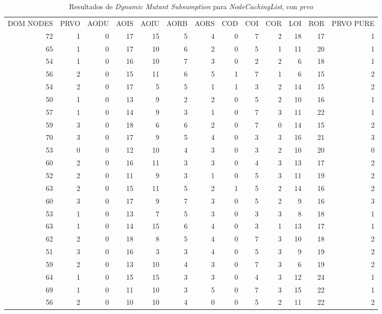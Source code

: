 \begin{table}[]
	\caption{Resultados de \emph{Dynamic Mutant Subsumption} para \emph{NodeCachingList}, con \emph{prvo}}
	\label{tables.results.subsumption.ncll.prvo}
	\centering
	\scriptsize
	\def\arraystretch{0.95}
	\setlength\tabcolsep{0.5mm}
	\begin{tabular}{rrrrrrrrrrrrr}
		DOM NODES & PRVO & AODU & AOIS & AOIU & AORB & AORS & COD & COI & COR & LOI & ROR & PRVO PURE \\
		72 & 1 & 0 & 17 & 15 & 5 & 4 & 0 & 7 & 2 & 18 & 17 & 1 \\
		65 & 1 & 0 & 17 & 10 & 6 & 2 & 0 & 5 & 1 & 11 & 20 & 1 \\
		54 & 1 & 0 & 16 & 10 & 7 & 3 & 0 & 2 & 2 & 6 & 18 & 1 \\
		56 & 2 & 0 & 15 & 11 & 6 & 5 & 1 & 7 & 1 & 6 & 15 & 2 \\
		54 & 2 & 0 & 17 & 5 & 5 & 1 & 1 & 3 & 2 & 14 & 15 & 2 \\
		50 & 1 & 0 & 13 & 9 & 2 & 2 & 0 & 5 & 2 & 10 & 16 & 1 \\
		57 & 1 & 0 & 14 & 9 & 3 & 1 & 0 & 7 & 3 & 11 & 22 & 1 \\
		59 & 3 & 0 & 18 & 6 & 6 & 2 & 0 & 7 & 0 & 14 & 15 & 2 \\
		70 & 3 & 0 & 17 & 9 & 5 & 4 & 0 & 3 & 3 & 16 & 21 & 3 \\
		53 & 0 & 0 & 12 & 10 & 4 & 3 & 0 & 3 & 2 & 10 & 20 & 0 \\
		60 & 2 & 0 & 16 & 11 & 3 & 3 & 0 & 4 & 3 & 13 & 17 & 2 \\
		52 & 2 & 0 & 11 & 9 & 3 & 1 & 0 & 5 & 3 & 11 & 19 & 2 \\
		63 & 2 & 0 & 15 & 11 & 5 & 2 & 1 & 5 & 2 & 14 & 16 & 2 \\
		60 & 3 & 0 & 17 & 9 & 7 & 3 & 0 & 5 & 2 & 9 & 16 & 3 \\
		53 & 1 & 0 & 13 & 7 & 5 & 3 & 0 & 3 & 3 & 8 & 18 & 1 \\
		63 & 1 & 0 & 14 & 15 & 6 & 4 & 0 & 3 & 1 & 13 & 17 & 1 \\
		62 & 2 & 0 & 18 & 8 & 5 & 4 & 0 & 7 & 3 & 10 & 18 & 2 \\
		51 & 3 & 0 & 16 & 3 & 3 & 4 & 0 & 5 & 3 & 9 & 19 & 2 \\
		59 & 2 & 0 & 13 & 10 & 4 & 3 & 0 & 7 & 3 & 6 & 19 & 2 \\
		64 & 1 & 0 & 15 & 15 & 3 & 3 & 0 & 4 & 3 & 12 & 24 & 1 \\
		69 & 1 & 0 & 11 & 10 & 3 & 5 & 0 & 7 & 3 & 15 & 22 & 1 \\
		56 & 2 & 0 & 10 & 10 & 4 & 0 & 0 & 5 & 2 & 11 & 22 & 2 \\

\end{tabular}
\end{table}
